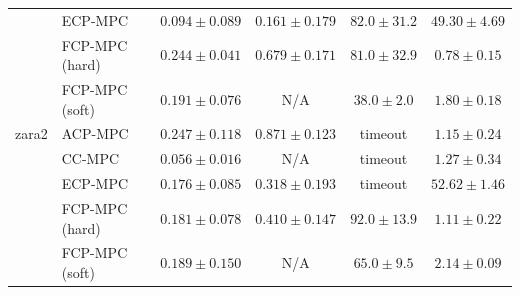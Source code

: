 \begin{tabular}{llcccc}
 & ECP-MPC~\cite{shin2025egocentric} & $0.094\pm0.089$ & $\mathbf{0.161}\pm0.179$ & $82.0\pm31.2$ & $49.30\pm4.69$ \\
 & FCP-MPC (hard) & $0.244\pm0.041$ & $0.679\pm0.171$ & $81.0\pm32.9$ & $\mathbf{0.78}\pm0.15$ \\
 & FCP-MPC (soft) & $0.191\pm0.076$ & N/A & $\mathbf{38.0}\pm2.0$ & $1.80\pm0.18$ \\
\hline
zara2 & ACP-MPC~\cite{dixit2023adaptive} & $0.247\pm0.118$ & $0.871\pm0.123$ & timeout & $1.15\pm0.24$ \\
 & CC-MPC~\cite{lekeufack2024decision} & $\mathbf{0.056}\pm0.016$ & N/A & timeout & $1.27\pm0.34$ \\
 & ECP-MPC~\cite{shin2025egocentric} & $0.176\pm0.085$ & $\mathbf{0.318}\pm0.193$ & timeout & $52.62\pm1.46$ \\
 & FCP-MPC (hard) & $0.181\pm0.078$ & $0.410\pm0.147$ & $92.0\pm13.9$ & $\mathbf{1.11}\pm0.22$ \\
 & FCP-MPC (soft) & $0.189\pm0.150$ & N/A & $\mathbf{65.0}\pm9.5$ & $2.14\pm0.09$ \\
\hline
\end{tabular}